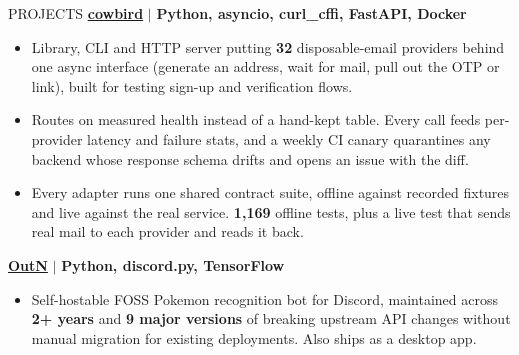 \documentclass{resume} %
\begin{document}
\begin{rSection}{PROJECTS}
\textbf{\href{https://github.com/Pranjal-SB/cowbird}{cowbird}} \(\mid\) \textbf{Python, asyncio, curl\_cffi, FastAPI, Docker}
\begin{itemize}
\itemsep -3pt{}
\item Library, CLI and HTTP server putting \textbf{32} disposable-email providers behind one async interface (generate an address, wait for mail, pull out the OTP or link), built for testing sign-up and verification flows.
\item Routes on measured health instead of a hand-kept table. Every call feeds per-provider latency and failure stats, and a weekly CI canary quarantines any backend whose response schema drifts and opens an issue with the diff.
\item Every adapter runs one shared contract suite, offline against recorded fixtures and live against the real service. \textbf{1,169} offline tests, plus a live test that sends real mail to each provider and reads it back.
\end{itemize}

\textbf{\href{https://github.com/Pranjal-SB/OutN}{OutN}} \(\mid\) \textbf{Python, discord.py, TensorFlow}
\begin{itemize}
\itemsep -3pt{}
\item Self-hostable FOSS Pokemon recognition bot for Discord, maintained across \textbf{2+ years} and \textbf{9 major versions} of breaking upstream API changes without manual migration for existing deployments. Also ships as a desktop app.
\end{itemize}
\end{rSection}






%     

\end{document}
